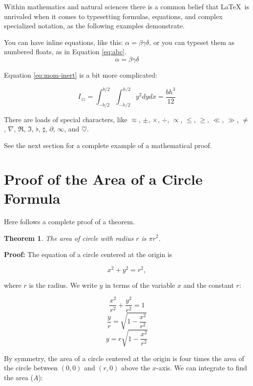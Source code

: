Within mathematics and natural sciences there is a common belief that \LaTeX\ is unrivaled when it comes to typesetting formulas, equations, and complex specialized notation, as the following examples demonstrate.

You can have inline equations, like this: $ \alpha = \beta \gamma \delta $, or you can typeset them as numbered floats, as in Equation \ref{eq:abc}.
\begin{equation}
  \alpha = \beta \gamma \delta
  \label{eq:abc}
\end{equation}

Equation \ref{eq:mom-inert} is a bit more complicated:

\begin{equation}
  I_{zz} = \int_{-b/2}^{b/2} \int_{-h/2}^{h/2} y^2 dy dx = \frac{b h^3}{12}
  \label{eq:mom-inert}
\end{equation}

There are loads of special characters, like $\approx$, $\pm$,
$\times$, $\div$, $\propto$, $\leq$, $\geq$, $\ll$, $\gg$, $\neq$,
$\nabla$, $\Re$, $\Im$, $\flat$, $\sharp$, $\partial$, $\infty$, and $\heartsuit$.


See the next section for a complete example of a mathematical proof.

\section{Proof of the Area of a Circle Formula}

Here follows a complete proof of a theorem.

\newtheorem{prf}{Theorem}

\begin{prf}
The area of circle with radius $r$ is $\pi r^2$.
\end{prf}

\noindent \textbf{Proof:} The equation of a circle centered at the
origin is

$$
x^2 + y^2 = r^2,
$$

\noindent where $r$ is the radius.  We  write $y$ in terms of the
variable $x$ and the constant $r$:

$$
\frac{x^2}{r^2} + \frac{y^2}{r^2} = 1
$$
$$
\frac{y}{r} = \sqrt{1-\frac{x^2}{r^2}}
$$
$$
y= r\sqrt {1-\frac{x^2}{r^2}}
$$

By symmetry, the area of a circle centered at the origin is four
times the area of the circle between $(0,0)$ and $(r, 0)$ above the
$x$-axis.  We can integrate to find the area ($A$):

